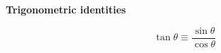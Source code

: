 \documentclass[a4paper]{article}
\title{}
\author{}
\date{}
\begin{document}
\begin{center}
    \Large{\textbf{Trigonometric identities}}
\end{center}

\begin{equation}
\tan{\theta} \equiv \frac{\sin{\theta}}{\cos{\theta}}
\end{equation}
\end{document}
